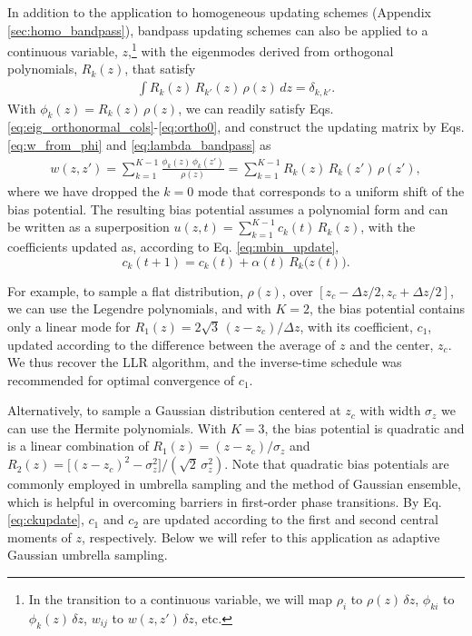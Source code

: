 \documentclass[preprint, superscriptaddress, floatfix]{revtex4-1}
\begin{document}
In addition to the application to homogeneous updating schemes
(Appendix \ref{sec:homo_bandpass}),
bandpass updating schemes can also be applied to
a continuous variable, $z$,\footnote{
  In the transition to a continuous variable,
  we will map
  $\rho_i$ to $\rho(z) \, \delta z$,
  $\phi_{ki}$ to $\phi_k(z) \, \delta z$,
  $w_{ij}$ to $w(z, z') \, \delta z$, etc.}
with the eigenmodes derived from orthogonal polynomials, $R_k(z)$,
that satisfy
\begin{align*}
  \int R_k(z) \, R_{k'}(z) \, \rho(z) \, d z = \delta_{k, k'}
  .
\end{align*}
%
With $\phi_k(z) = R_k(z) \, \rho(z)$,
we can readily satisfy Eqs. \eqref{eq:eig_orthonormal_cols}-\eqref{eq:ortho0},
and construct the updating matrix by
Eqs. \eqref{eq:w_from_phi} and \eqref{eq:lambda_bandpass} as
\begin{align*}
  w(z, z')
  =
  \sum_{k=1}^{K-1} \frac{ \phi_k(z) \, \phi_k(z') } { \rho(z) }
  = \sum_{k=1}^{K-1} R_k(z) \, R_k(z') \, \rho(z'),
\end{align*}
%
where we have dropped the $k=0$ mode
that corresponds to a uniform shift
of the bias potential.
%
The resulting bias potential
assumes a polynomial form
and can be written as a superposition
$u(z, t) = \sum_{k=1}^{K-1} c_k(t) \, R_k(z)$,
with the coefficients updated as, according to Eq. \eqref{eq:mbin_update},
\begin{equation}
  c_k(t+1) = c_k(t) + \alpha(t) \, R_k\bigl( z(t) \bigr)
  .
  \label{eq:ckupdate}
\end{equation}


For example,
to sample a flat distribution, $\rho(z)$,
over $[z_c - \Delta z/2, z_c + \Delta z/2]$,
we can use the Legendre polynomials\cite{arfken},
and with $K = 2$,
the bias potential contains only a linear mode for
$R_1(z) = 2 \sqrt{3} \, (z - z_c)/\Delta z$,
with its coefficient, $c_1$, updated according to
the difference between the average of $z$
and the center, $z_c$.
%
We thus recover the LLR
algorithm\cite{langfeld2012},
and the inverse-time schedule
was recommended for optimal convergence of $c_1$\cite{pellegrini2014}.

Alternatively,
to sample a Gaussian distribution
centered at $z_c$ with width $\sigma_z$
we can use the Hermite polynomials\cite{arfken}.
%
With $K = 3$, the bias potential is quadratic
and is a linear combination of
$R_1(z) = (z - z_c)/\sigma_z$
and
$R_2(z) = \bigl[(z - z_c)^2 - \sigma_z^2\bigr] /\left(\sqrt 2 \, \sigma_z^2\right)$.
%
Note that quadratic bias potentials are commonly
employed\cite{maragliano2006, *abrams2008, zhu2012, neuhaus2006, *neuhaus2007}
in umbrella sampling\cite{torrie1974, *torrie1977}
and the method of Gaussian ensemble\cite{hetherington1987,
*challa1988, *costeniuc2006},
which is helpful in overcoming barriers
in first-order phase transitions.
%
By Eq. \eqref{eq:ckupdate},
$c_1$ and $c_2$ are updated
according to the first and second
central moments of $z$, respectively.
%
Below we will refer to this application
as adaptive Gaussian umbrella sampling.
\end{document}
